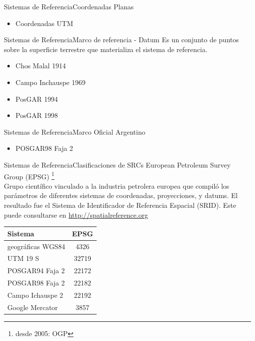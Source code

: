 \documentclass{beamer}
\begin{document}
\begin{frame}{Sistemas de Referencia}{Coordenadas Planas}
		\begin{itemize}
			\item Coordenadas UTM
		\end{itemize}
\end{frame}

\begin{frame}{Sistemas de Referencia}{Marco de referencia - Datum}
		Es un conjunto de puntos sobre la superficie terrestre que materializa el sistema de referencia.
		\begin{itemize}
			\item Chos Malal 1914
			\item Campo Inchauspe 1969
			\item PosGAR 1994
			\item PosGAR 1998
		\end{itemize}
\end{frame}

\begin{frame}{Sistemas de Referencia}{Marco Oficial Argentino}
			\begin{itemize}
				\item  POSGAR98 Faja 2
			\end{itemize}
\end{frame}

\begin{frame}{Sistemas de Referencia}{Clasificaciones de SRCs}
	European Petroleum Survey Group (EPSG) \footnote{desde 2005: OGP}\\
	
	Grupo científico vinculado a la industria petrolera europea que compiló los parámetros de diferentes sistemas de coordenadas, proyecciones, y datums.	El resultado fue el Sistema de Identificador de Referencia Espacial (SRID). Este puede consultarse en \url{http://spatialreference.org} 
	\begin{table}
	\centering
		\begin{tabular}{l|c}
		\toprule
		Sistema           & EPSG  \\
		\midrule
		geográficas WGS84 & 4326  \\
		UTM 19 S          & 32719 \\
		POSGAR94 Faja 2   & 22172 \\
		POSGAR98 Faja 2   & 22182 \\
		Campo Ichauspe 2  & 22192 \\
		Google Mercator   & 3857 
		\bottomrule
		\end{tabular}
	\end{table}	
\end{frame}
\end{document}
